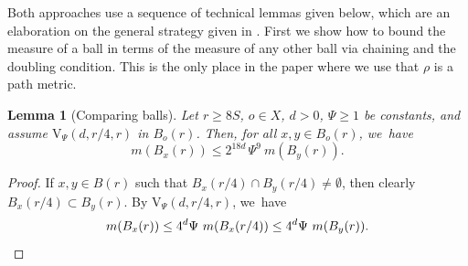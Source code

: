 \documentclass[10pt]{amsart}
\newcommand{\rV}{\mathrm{V}}
\theoremstyle{plain}
\newtheorem{lemma}[theorem]{Lemma}
\theoremstyle{definition}
\begin{document}
Both approaches use a sequence of technical lemmas given below, which are an elaboration on the general strategy given in \cite{SaloffC-01}. First we show how to bound the measure of a ball in terms of the measure of any other ball via chaining and the doubling condition. This is the only place in the paper where we use that $ \rho $ is a path metric.
\begin{lemma}[Comparing balls]\label{lem:ballcomparison}
Let {$r\ge 8S $}, $ o\in X $, $ d>0$, $\Psi\geq 1$ be constants,
and assume $\rV_\Psi (d,r/4,r)$ in $B_{o}(r)$. Then, for all $x,y\in B_o(r)$, we~have
\[
m(B_x(r))
\leq
2^{18d}\,
\Psi^{9}
\ m(B_{y}(r)).
\]
\end{lemma}
\begin{proof}
If $x, y\in B(r)$ such that $B_x(r/4)\cap B_y(r/4)\neq \emptyset$, then clearly $B_x(r/4)\subset B_y(r)$. By $\rV_\Psi(d,r/4,r)$, we~have
\[
m(B_x(r))
\\
\leq 4^d\Psi\ m(B_x(r/4))\leq 4^d\Psi\ m(B_y(r)).
\]


\end{proof}
\end{document}
